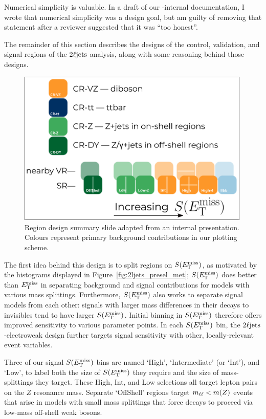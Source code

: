 Numerical simplicity is valuable.
In a draft of our \atlas-internal documentation, I wrote that numerical
simplicity was a design goal, but am guilty of removing that statement after a
reviewer suggested that it was ``too honest''.

The remainder of this section describes the designs of the control,
validation, and signal regions of the $2\ell\mathrm{jets}$ analysis, along with some
reasoning behind those designs.

\begin{figure}[tp]
\centering
\includegraphics[width=0.99\textwidth]{figures/2Ljets_pam_ewkslide.png}
\caption[
Region design summary slide
]{%
Region design summary slide adapted from an internal presentation.
Colours represent primary background contributions in our plotting scheme.
}
\label{fig:2ljets_region_summary}
\end{figure}

The first idea behind this design is to split regions on $S(E_\mathrm{T}^\mathrm{miss})$, as
motivated by the histograms displayed in Figure~\ref{fig:2ljets_presel_met};
$S(E_\mathrm{T}^\mathrm{miss})$ does better than $E_\mathrm{T}^\mathrm{miss}$ in separating background and signal
contributions for models with various mass splittings.
Furthermore, $S(E_\mathrm{T}^\mathrm{miss})$ also works to separate signal models from each other:
signals with larger mass differences in their decays to invisibles tend to have
larger $S(E_\mathrm{T}^\mathrm{miss})$.
Initial binning in $S(E_\mathrm{T}^\mathrm{miss})$ therefore offers improved sensitivity to
various parameter points.
In each $S(E_\mathrm{T}^\mathrm{miss})$ bin, the $2\ell\mathrm{jets}$-electroweak design further targets
signal sensitivity with other, locally-relevant event variables.

Three of our signal $S(E_\mathrm{T}^\mathrm{miss})$ bins are named
`High',
`Intermediate' (or `Int'), and
`Low',
to label both the size of $S(E_\mathrm{T}^\mathrm{miss})$ they require and the size of
mass-splittings they target.
These High, Int, and Low selections all target lepton pairs on the $Z$
resonance mass.
Separate `OffShell' regions target $m_{\ell\ell} < m(Z)$ events that arise
in models with small mass splittings that force decays to proceed via
low-mass off-shell weak bosons.

